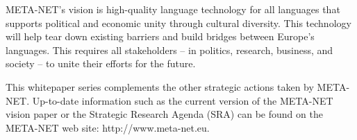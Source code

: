 \documentclass[]{../../metanetpaper}
\begin{document}
\begin{multicols}{2}
META-NET’s vision is high-quality language technology for all languages that supports political and economic unity through cultural diversity. This technology will help tear down existing barriers and build bridges between Europe’s languages. This requires all stakeholders -- in politics, research, business, and society -- to unite their efforts for the future.

This whitepaper series complements the other strategic actions taken by META-NET. Up-to-date information such as the current version of the META-NET vision paper \cite{Meta1} or the Strategic Research Agenda (SRA) can be found on the META-NET web site: http://www.meta-net.eu.
\end{multicols}

\clearpage

\end{document}
